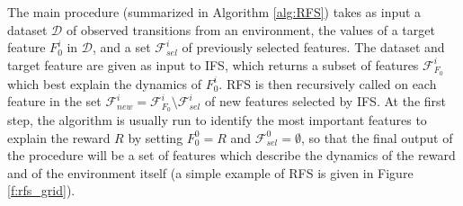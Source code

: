 The main procedure (summarized in Algorithm \ref{alg:RFS}) takes as input a 
dataset $\mathcal{D}$ of observed transitions from an environment, the values 
of a target feature $F_0^i$ in $\mathcal{D}$, and a set $\mathcal{F}_{sel}^i$ of
previously selected features. 
The dataset and target feature are given as input to IFS, which returns a subset
of features $\mathcal{F}_{F_0}^i$ which best explain the dynamics of $F_0^i$. 
RFS is then recursively called on each feature in the set 
$\mathcal{F}_{new}^i = \mathcal{F}_{F_0}^i \setminus \mathcal{F}_{sel}^i$ of new
features selected by IFS.
At the first step, the algorithm is usually run to identify the most important 
features to explain the reward $R$ by setting $F_0^0 = R$ and 
$\mathcal{F}_{sel}^0 = \emptyset$, so that the final output of the procedure 
will be a set of features which describe the dynamics of the reward and of the 
environment itself (a simple example of RFS is given in Figure \ref{f:rfs_grid}).
%

